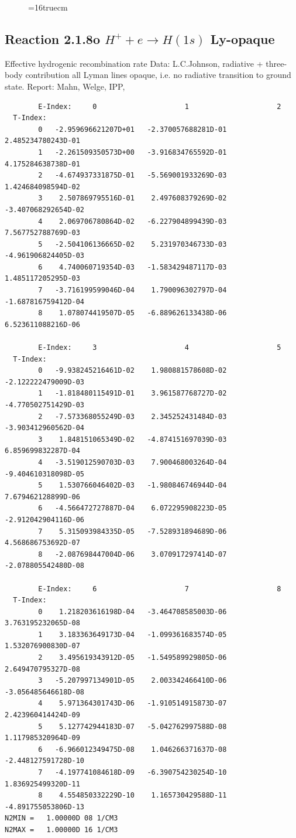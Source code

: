 \documentclass[12pt,dvipdfmx]{article}
\begin{document}
\begin{figure} \label{2.1.8}
\epsfxsize=16truecm
\end{figure}
\newpage

\subsection{
  Reaction 2.1.8o $ H^+ + e \rightarrow H(1s) $ Ly-opaque
}

   Effective hydrogenic recombination rate
   Data: L.C.Johnson, radiative + three-body contribution
   all Lyman lines opaque, i.e. no radiative transition to ground state.
   Report: Mahn, Welge, IPP, \cite{kn:Mahn}


\begin{small}\begin{verbatim}
        E-Index:     0                     1                     2
  T-Index:
        0   -2.959696621207D+01   -2.370057688281D-01    2.485234780243D-01
        1   -2.261509350573D+00   -3.916834765592D-01    4.175284638738D-01
        2   -4.674937331875D-01   -5.569001933269D-03    1.424684098594D-02
        3    2.507869795516D-01    2.497608379269D-02   -3.407068292654D-02
        4    2.069706780864D-02   -6.227904899439D-03    7.567752788769D-03
        5   -2.504106136665D-02    5.231970346733D-03   -4.961906824405D-03
        6    4.740060719354D-03   -1.583429487117D-03    1.485117205295D-03
        7   -3.716199599046D-04    1.790096302797D-04   -1.687816759412D-04
        8    1.078074419507D-05   -6.889626133438D-06    6.523611088216D-06

        E-Index:     3                     4                     5
  T-Index:
        0   -9.938245216461D-02    1.980881578608D-02   -2.122222479009D-03
        1   -1.818480115491D-01    3.961587768727D-02   -4.770502751429D-03
        2   -7.573368055249D-03    2.345252431484D-03   -3.903412960562D-04
        3    1.848151065349D-02   -4.874151697039D-03    6.859699832287D-04
        4   -3.519012590703D-03    7.900468003264D-04   -9.404610318098D-05
        5    1.530766046402D-03   -1.980846746944D-04    7.679462128899D-06
        6   -4.566472727887D-04    6.072295908223D-05   -2.912042904116D-06
        7    5.315093984335D-05   -7.528931894689D-06    4.568686753692D-07
        8   -2.087698447004D-06    3.070917297414D-07   -2.078805542480D-08

        E-Index:     6                     7                     8
  T-Index:
        0    1.218203616198D-04   -3.464708585003D-06    3.763195232065D-08
        1    3.183363649173D-04   -1.099361683574D-05    1.532076900830D-07
        2    3.495619343912D-05   -1.549589929805D-06    2.649470795327D-08
        3   -5.207997134901D-05    2.003342466410D-06   -3.056485646618D-08
        4    5.971364301743D-06   -1.910514915873D-07    2.423960414424D-09
        5    5.127742944183D-07   -5.042762997588D-08    1.117985320964D-09
        6   -6.966012349475D-08    1.046266371637D-08   -2.448127591728D-10
        7   -4.197741084618D-09   -6.390754230254D-10    1.836925499320D-11
        8    4.554850332229D-10    1.165730429588D-11   -4.891755053806D-13
N2MIN =   1.00000D 08 1/CM3
N2MAX =   1.00000D 16 1/CM3


\end{verbatim}
\end{small}
\end{document}
